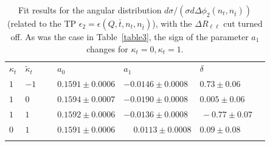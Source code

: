 \documentclass[aps,preprint,tightenlines,floatfix,superscriptaddress,nofootinbib,showpacs]{revtex4-1}
\def\tbar{\bar{t}}
\def\kp{\kappa_t}
\begin{document}
\begin{table}[H]
\caption{Fit results for the angular distribution $d\sigma/(\sigma
  d\Delta\phi_2(n_t,n_{\tbar}))$ (related to the TP
  $\epsilon_2=\epsilon(Q,\tbar,n_t,n_{\tbar})$), with the $\Delta
  R_{\ell\ell}$ cut turned off. As was the case in Table~\ref{table3},
  the sign of the parameter $a_1$ changes for
  $\kp=0,\kp=1$.}
\label{table4}
\begin{center}
\begin{tabular}{|C{1cm}|C{1cm}||C{3cm}|C{3cm}|C{3cm}|}
\hhline{|=====|}
$\kappa_t$&$\tilde{\kappa}_t$~~&$a_0$~~&$a_1$& $\delta$~~ \\ 
\hhline{|=====|} 
$1$ & $-1$~~~ & $0.1591 \pm 0.0006$ & $-0.0146 \pm 0.0008$ & $0.73 \pm 0.06$ \\[0.6mm]
\hline
$1$ & $0$ & $0.1594 \pm 0.0007$ & $-0.0190 \pm 0.0008$ & $0.005 \pm 0.06\,\,$ \\[0.6mm]
\hline
$1$ & $1$ & $0.1592 \pm 0.0006$ & $-0.0136 \pm 0.0008 $ & $\,-0.77 \pm 0.07\quad$  \\[0.6mm]
\hline
$0$ & $1$ & $0.1591 \pm 0.0006$ & ~~$\,0.0113 \pm 0.0008$ & $0.09 \pm 0.08$ \\
\hhline{|=====|}
\end{tabular}
\end{center} 
\end{table}
\par
\end{document}
